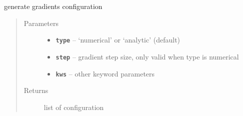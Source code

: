 \documentclass[letterpaper,10pt,english]{sphinxmanual}
\begin{document}
\begin{fulllineitems}

\begin{fulllineitems}
\label{src/apidocs/dakutils:genopt.dakutils.DakotaResponses.gradients}
generate gradients configuration
\begin{quote}\begin{description}
\item[{Parameters}] \leavevmode\begin{itemize}
\item {} 
\textbf{\texttt{type}} -- `numerical' or `analytic' (default)

\item {} 
\textbf{\texttt{step}} -- gradient step size, only valid when type is numerical

\item {} 
\textbf{\texttt{kws}} -- other keyword parameters

\end{itemize}

\item[{Returns}] \leavevmode
list of configuration

\end{description}\end{quote}

\end{fulllineitems}


\end{fulllineitems}

\end{document}
